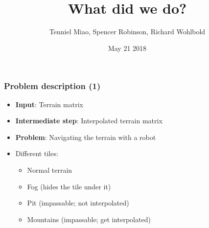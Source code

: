 \documentclass{beamer}
\title{What did we do?}
\author{Tenniel Miao, Spencer Robinson, Richard Wohlbold}
\date{May 21 2018}
\begin{document}
\maketitle

\begin{frame}
    \frametitle{Problem description (1)}
    
    \begin{itemize}
        \item \textbf{Input}: Terrain matrix
        \item \textbf{Intermediate step}: Interpolated terrain matrix
        \item \textbf{Problem}: Navigating the terrain with a robot
        \item Different tiles:
            \begin{itemize}
                \item Normal terrain
                \item Fog (hides the tile under it)
                \item Pit (impassable; not interpolated)
                \item Mountains (impassable; get interpolated)
            \end{itemize}
    \end{itemize}
    
\end{frame}
\end{document}
